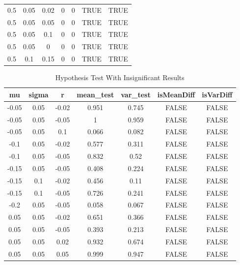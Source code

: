 \documentclass[
10pt, %
a4paper, %
oneside, %
headinclude,footinclude, %
BCOR5mm, %
]{scrartcl}
\begin{document}
\begin{table}[H]
\begin{tabular}{|c|c|c|c|c|c|c|}
		0.5   & 0.05  & 0.02  & 0          & 0         & TRUE       & TRUE      \\
		0.5   & 0.05  & 0.05  & 0          & 0         & TRUE       & TRUE      \\
		0.5   & 0.05  & 0.1   & 0          & 0         & TRUE       & TRUE      \\
		0.5   & 0.05  & 0     & 0          & 0         & TRUE       & TRUE      \\
		0.5   & 0.1   & 0.15  & 0          & 0         & TRUE       & TRUE   \\ 
		\hline 
	\end{tabular}
\end{table}
\newpage

\begin{table}[H]
	\centering
	\caption{Hypothesis Test With Insignificant Results}
	\label{my-label}
	\begin{tabular}{|c|c|c|c|c|c|c|}
		\hline
		mu    & sigma & r     & mean\_test & var\_test & isMeanDiff & isVarDiff \\
		\hline
		-0.05 & 0.05  & -0.02 & 0.951      & 0.745     & FALSE      & FALSE     \\
		-0.05 & 0.05  & -0.05 & 1          & 0.959     & FALSE      & FALSE     \\
		-0.05 & 0.05  & 0.1   & 0.066      & 0.082     & FALSE      & FALSE     \\
		-0.1  & 0.05  & -0.02 & 0.577      & 0.311     & FALSE      & FALSE     \\
		-0.1  & 0.05  & -0.05 & 0.832      & 0.52      & FALSE      & FALSE     \\
		-0.15 & 0.05  & -0.05 & 0.408      & 0.224     & FALSE      & FALSE     \\
		-0.15 & 0.1   & -0.02 & 0.456      & 0.11      & FALSE      & FALSE     \\
		-0.15 & 0.1   & -0.05 & 0.726      & 0.241     & FALSE      & FALSE     \\
		-0.2  & 0.05  & -0.05 & 0.058      & 0.067     & FALSE      & FALSE     \\
		0.05  & 0.05  & -0.02 & 0.651      & 0.366     & FALSE      & FALSE     \\
		0.05  & 0.05  & -0.05 & 0.393      & 0.213     & FALSE      & FALSE     \\
		0.05  & 0.05  & 0.02  & 0.932      & 0.674     & FALSE      & FALSE     \\
		0.05  & 0.05  & 0.05  & 0.999      & 0.947     & FALSE      & FALSE     \\

\end{tabular}
\end{table}
\end{document}
